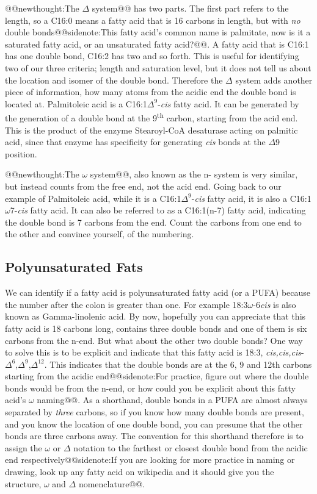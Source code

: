 \documentclass{tufte-handout}
\makeatletter
\def\newthought#1{@@newthought:#1@@}
\def\sidenote#1{@@sidenote:#1@@}
\makeatother
\begin{document}
\newthought{The $\Delta$ system} has two parts.  The first part refers to the length, so a C16:0 means a fatty acid that is 16 carbons in length, but with \emph{no} double bonds\sidenote{This fatty acid's common name is palmitate, now is it a saturated fatty acid, or an unsaturated fatty acid?}.  A fatty acid that is C16:1 has one double bond, C16:2 has two and so forth.  This is useful for identifying two of our three criteria; length and saturation level, but it does not tell us about the location and isomer of the double bond.  Therefore the $\Delta$ system adds another piece of information, how many atoms from the acidic end the double bond is located at.  Palmitoleic acid is a C16:1$\Delta^9$-\textit{cis} fatty acid.  It can be generated by the generation of a double bond at the 9\textsuperscript{th} carbon, starting from the acid end.  This is the product of the enzyme Stearoyl-CoA desaturase acting on palmitic acid, since that enzyme has specificity for generating \textit{cis} bonds at the $\Delta$9 position.

\newthought{The $\omega$ system}, also known as the n- system is very similar, but instead counts from the free end, not the acid end.  Going back to our example of Palmitoleic acid, while it is a C16:1$\Delta^9$-\textit{cis} fatty acid, it is also a C16:1$\omega$7-\textit{cis} fatty acid.  It can also be referred to as a C16:1(n-7) fatty acid, indicating the double bond is 7 carbons from the end.  Count the carbons from one end to the other and convince yourself, of the numbering.

\subsection{Polyunsaturated Fats}

We can identify if a fatty acid is polyunsaturated fatty acid (or a PUFA) because the number after the colon is greater than one.  For example 18:3$\omega$-6\textit{cis} is also known as Gamma-linolenic acid.  By now, hopefully you can appreciate that this fatty acid is 18 carbons long, contains three double bonds and one of them is six carbons from the n-end.  But what about the other two double bonds?  One way to solve this is to be explicit and indicate that this fatty acid is 18:3, \textit{cis,cis,cis}-$\Delta^6$,$\Delta^9$,$\Delta^{12}$.  This indicates that the double bonds are at the 6, 9 and 12th carbons starting from the acidic end\sidenote{For practice, figure out where the double bonds would be from the n-end, or how could you be explicit about this fatty acid's $\omega$ naming}.  As a shorthand, double bonds in a PUFA are almost always separated by \emph{three} carbons, so if you know how many double bonds are present, and you know the location of one double bond, you can presume that the other bonds are three carbons away.  The convention for this shorthand therefore is to assign the $\omega$ or $\Delta$ notation to the farthest or closest double bond from the acidic end respectively\sidenote{If you are looking for more practice in naming or drawing, look up any fatty acid on wikipedia and it should give you the structure, $\omega$ and $\Delta$ nomenclature}.
\end{document}
